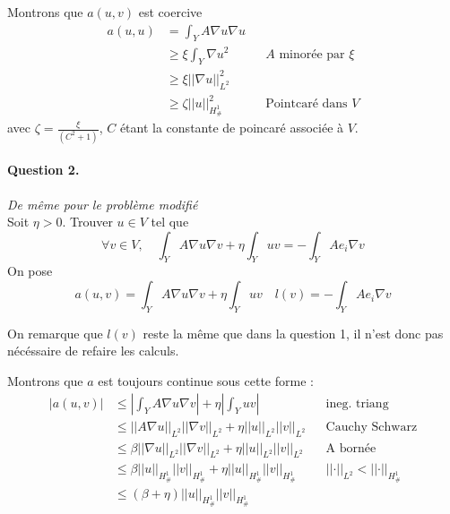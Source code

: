 \message{ !name(rapport.tex)}\documentclass[11pt]{article}
\newcommand{\norm}[1]{\left|\left|#1\right|\right|}
\newcommand{\question}[2]{\paragraph{Question #1.}\textit{#2} \\}
\newcommand{\Hd}{H^1_{\#}}
\begin{document}
Montrons que $a(u,v)$ est coercive
\begin{align}
  \label{eq:co}
  a(u,u) &= \int_Y A \nabla u  \nabla u \\
         &\geq \xi \int_Y \nabla u^2  && \text{$A$ minorée par $\xi$}\\
         &\geq \xi \norm{\nabla u}^2_{L^2} \\
         &\geq \zeta \norm{u}^2_{\Hd} && \text{Pointcaré dans $V$} 
\end{align}
avec $\zeta = \frac{\xi}{(C^2+1)}$, $C$ étant la constante de poincaré associée à $V$.


\question{2}{De même pour le problème modifié}

Soit $\eta>0$. Trouver $u \in V$ tel que
\begin{equation}
  \label{eq:pbcelleta}
  \forall v \in V, \quad \int_Y A \nabla u \nabla v + \eta \int_Y u v = - \int_Y A e_i \nabla v
\end{equation}
On pose
\begin{equation}
  a(u,v) = \int_Y A \nabla u \nabla v + \eta \int_Y u v \quad
  l(v) = -\int_Y A e_i \nabla v
\end{equation}

On remarque que $l(v)$ reste la même que dans la question 1, il n'est donc pas nécéssaire de refaire les calculs.

Montrons que $a$ est toujours continue sous cette forme :
\begin{align}
  \label{eq:ac}
  \big|a(u,v)\big| &\leq \left| \int_Y A \nabla u \nabla v \right| + \eta \left| \int_Y  u v \right| && \mbox{ineg. triang} \\
                   &\leq \norm{A\nabla u}_{L^2} \norm{\nabla v}_{L^2} + \eta \norm{u}_{L^2} \norm{v}_{L^2} && \mbox{Cauchy Schwarz} \\
                   &\leq \beta \norm{\nabla u}_{L^2} \norm{\nabla v}_{L^2} + \eta \norm{u}_{L^2} \norm{v}_{L^2} && \mbox{A bornée} \\
                   &\leq \beta \norm{u}_{\Hd} \norm{v}_{\Hd} + \eta \norm{u}_{\Hd} \norm{v}_{\Hd} && \norm{\cdot}_{L^2}<\norm{\cdot}_{\Hd} \\
                   &\leq (\beta + \eta) \norm{u}_{\Hd} \norm{v}_{\Hd}
\end{align}
\end{document}
